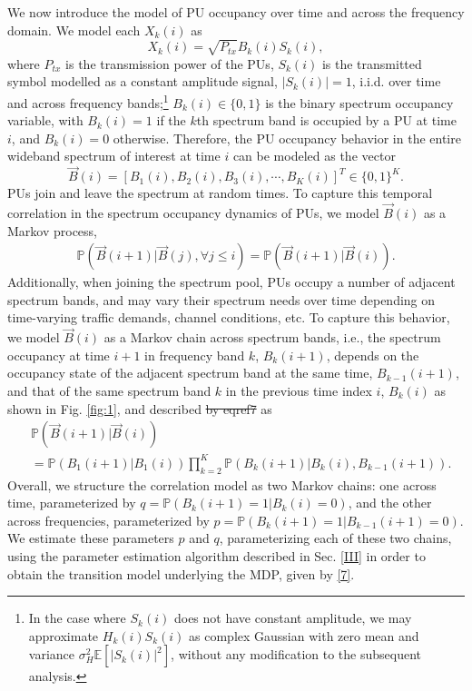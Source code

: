 \documentclass[10pt,twocolumn]{IEEEtran}
\newcommand{\sst}[1]{\st{#1}}
\begin{document}
We now introduce the model of PU occupancy over time and across the frequency domain. We model each $X_k(i)$ as 
\begin{equation}\label{4}
    X_k(i) = \sqrt{P_{tx}}B_k(i)S_k(i),
\end{equation}
where $P_{tx}$ is the transmission power of the PUs, $S_k(i)$ is the transmitted symbol modelled as a constant amplitude signal, $|S_k(i)|{=}1$, i.i.d. over time and across frequency bands;\footnote{In the case where $S_k(i)$ does not have constant amplitude, we may approximate $H_{k}(i)S_{k}(i)$ as complex Gaussian with zero mean and variance $\sigma_H^2\mathbb E[|S_{k}(i)|^2]$, without any modification to the subsequent analysis.} $B_k(i){\in}\{0,1\}$ is the binary spectrum occupancy variable, with $B_k(i){=}1$ if the $k$th spectrum band is occupied by a PU at time $i$, and $B_k(i){=}0$ otherwise. Therefore, the PU occupancy behavior in the entire wideband spectrum of interest at time $i$ can be modeled as the vector 
\begin{equation}\label{5}
    \vec{B}(i) = [B_1(i), B_2(i), B_3(i), \cdots, B_K(i)]^T {\in} \{0, 1\}^K.
\end{equation}
PUs join and leave the spectrum at random times. To capture this temporal correlation in the spectrum occupancy dynamics of PUs, we model $\vec{B}(i)$ as a Markov process,
\begin{equation}\label{6}
    \begin{aligned}
        \mathbb{P}(\vec{B}(i+1)|\vec{B}(j), \forall j \leq i) = \mathbb{P}(\vec{B}(i+1)|\vec{B}(i)).
    \end{aligned}
\end{equation}
Additionally, when joining the spectrum pool, PUs occupy a number of adjacent spectrum bands, and may vary their spectrum needs over time depending on time-varying traffic demands, channel conditions, etc. To capture this behavior, we model $\vec{B}(i)$ as a Markov chain across spectrum bands, i.e., the spectrum occupancy at time $i+1$ in frequency band $k$, $B_{k}(i+1)$, depends on the  occupancy state of the adjacent spectrum band at the same time, $B_{k-1}(i+1)$, and that of the same spectrum band $k$ in the previous time index $i$, $B_{k}(i)$ as shown in Fig. \ref{fig:1}, and described\sst{ by eqref{7} } as
\begin{align}\label{7}
&         \mathbb{P}(\vec{B}(i+1)|\vec{B}(i))\\&=
\nonumber
         \mathbb{P}(B_{1}(i+1)|B_{1}(i))
         \prod_{k=2}^{K} \mathbb{P}(B_{k}(i+1)|B_{k}(i), B_{k-1}(i+1)).
\end{align}
Overall, we structure the correlation model as two Markov chains: one across time, parameterized by $q{=}\mathbb{P}(B_{k}(i{+}1){=}1|B_{k}(i){=}0)$, and the other across frequencies, parameterized by $p{=}\mathbb{P}(B_{k}(i{+}1){=}1|B_{k{-}1}(i{+}1){=}0)$. We estimate these parameters $p$ and $q$, parameterizing each of these two chains, using the parameter estimation algorithm described in Sec. \ref{III} in order to obtain the transition model underlying the MDP, given by \eqref{7}.
\end{document}
